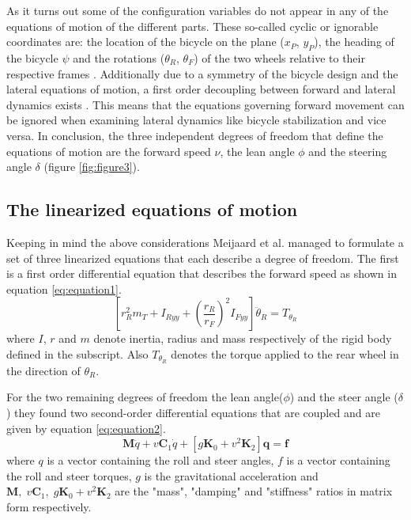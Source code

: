 \par
As it turns out some of the configuration variables do not appear in any of the equations of motion of the different parts. These so-called cyclic or ignorable coordinates are: the location of the bicycle on the plane (\ensuremath{x_{P}}, \ensuremath{y_{P}}), the heading of the bicycle \ensuremath{\psi} and the rotations (\ensuremath{\theta_{R}}, \ensuremath{\theta_{F}}) of the two wheels relative to their respective frames \cite{meijaard2007linearized}. Additionally due to a symmetry of the bicycle design and the lateral equations of motion, a  first order decoupling between forward and lateral dynamics exists \cite{meijaard2007linearized}. This means that the equations governing forward movement can be ignored when examining lateral dynamics like bicycle stabilization and vice versa. In conclusion, the three independent degrees of freedom that define the equations of motion are the  forward speed \ensuremath{\nu},  the lean angle \ensuremath{\phi} and the  steering angle \ensuremath{\delta} (figure \ref{fig:figure3}).
\subsection{The linearized equations of motion}
Keeping in mind the above considerations Meijaard et al.\cite{meijaard2007linearized} managed to formulate a set of three linearized equations that each describe a degree of freedom. The first is a first order differential equation that describes the forward speed as shown in equation \ref{eq:equation1}\cite{meijaard2007linearized}.
\begin{equation}
    \left[r_{R}^{2} m_{T}+I_{R y y}+\left(\frac{r_{R}}{r_{F}}\right)^{2} I_{F y y}\right] \ddot{\theta}_{R}=T_{\theta_{R}}
    \label{eq:equation1}
\end{equation}
where \ensuremath{I}, \ensuremath{r} and \ensuremath{m} denote inertia, radius and mass respectively of the rigid body defined in the subscript. Also \ensuremath{T_{\theta_{R}}} denotes the torque applied to the rear wheel in the direction of \ensuremath{\theta_{R}}.
\par
For the two remaining degrees of freedom the lean angle(\ensuremath{\phi}) and the steer angle (\ensuremath{\delta}) they found two second-order differential equations that are coupled and are given by equation \ref{eq:equation2}\cite{meijaard2007linearized}.
\begin{equation}
    \mathbf{M} \ddot{q}+v \mathbf{C}_{1} \dot{q}+\left[g \mathbf{K}_{0}+v^{2} \mathbf{K}_{2}\right] \mathbf{q}=\mathbf{f}
    \label{eq:equation2}
\end{equation}
where \ensuremath{q} is a vector containing the roll and steer angles, \ensuremath{f} is a vector containing the roll and steer torques, \ensuremath{g} is the gravitational acceleration and \ensuremath{\mathbf{M},\;v\mathbf{C}_{1},\;g \mathbf{K}_{0}+v^{2} \mathbf{K}_{2}} are the "mass", "damping" and "stiffness" ratios in matrix form respectively.

